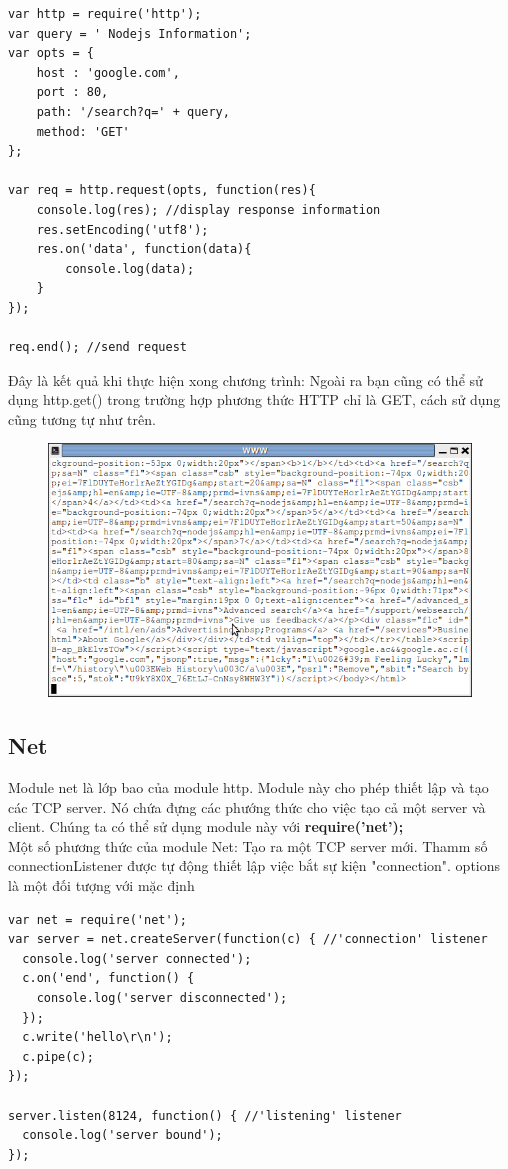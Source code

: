 	\begin{verbatim}
var http = require('http');
var query = ' Nodejs Information';
var opts = {
	host : 'google.com',
    port : 80,
    path: '/search?q=' + query,
    method: 'GET'
};

var req = http.request(opts, function(res){
	console.log(res); //display response information 
    res.setEncoding('utf8');
    res.on('data', function(data){
		console.log(data);
    }
});

req.end(); //send request
	\end{verbatim}
	
	Đây là kết quả khi thực hiện xong chương trình:
	Ngoài ra bạn cũng có thể sử dụng http.get() trong trường hợp phương thức HTTP chỉ là GET, cách sử dụng cũng tương tự như trên.
	\begin{figure}[-h]
		\centering
		\includegraphics[scale=0.7]{3_3_6}
	\end{figure}
	
\newpage
	
\subsection{Net}
	Module net là lớp bao của module http. Module này cho phép thiết lập và tạo các TCP server. Nó chứa đựng các phướng thức cho việc tạo cả một server và client. Chúng ta có thể sử dụng module này với \textbf{require('net');}\\
Một số phương thức của module Net:
        Tạo ra một TCP server mới. Thamm số connectionListener được tự động thiết lập việc bắt sự kiện "connection". options là một đối tượng với mặc định \\
            \begin{verbatim}
var net = require('net');
var server = net.createServer(function(c) { //'connection' listener
  console.log('server connected');
  c.on('end', function() {
    console.log('server disconnected');
  });
  c.write('hello\r\n');
  c.pipe(c);
});

server.listen(8124, function() { //'listening' listener
  console.log('server bound');
});
            \end{verbatim}
        \\    
